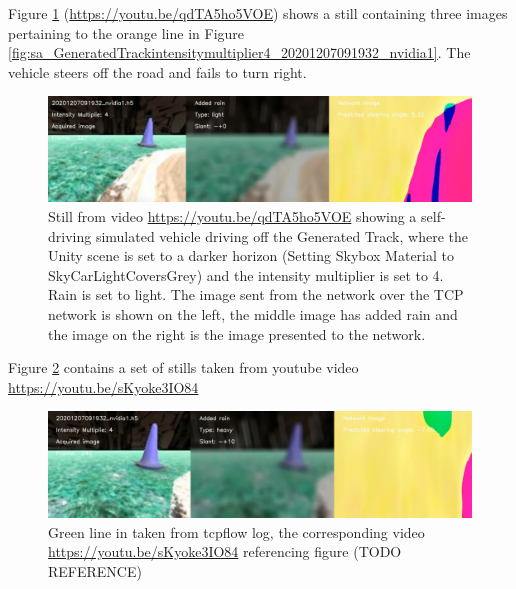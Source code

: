 Figure \ref{fig:youtube20201207091932nvidia1lightrainmult_4_h5} (\url{https://youtu.be/qdTA5ho5VOE}) shows a still containing three images pertaining to the orange line in Figure \ref{fig:sa_GeneratedTrackintensitymultiplier4_20201207091932_nvidia1}. The vehicle steers off the road and fails to turn right.

\begin{figure}[ht]
 \centering 
 \includegraphics[width=\textwidth]{Figures/youtube20201207091932nvidia1lightrainmult_4_h5.png}
 \caption{Still from video \url{https://youtu.be/qdTA5ho5VOE} showing a self-driving simulated vehicle driving off the Generated Track, where the Unity scene is set to a darker horizon (Setting Skybox Material to SkyCarLightCoversGrey) and the intensity multiplier is set to 4. Rain is set to light. The image sent from the network over the TCP network is shown on the left, the middle image has added rain and the image on the right is the image presented to the network.}
 \label{fig:youtube20201207091932nvidia1lightrainmult_4_h5} 
\end{figure}

Figure \ref{fig:youtube20201207091932nvidia1heavy10mult_4_h5} contains a set of stills taken from youtube video \url{https://youtu.be/sKyoke3IO84}
\begin{figure}[ht]
 \centering 
 \includegraphics[width=\textwidth]{Figures/youtube20201207091932nvidia1heavy10mult_4_h5.png}
 \caption{Green line in taken from tcpflow log, the corresponding video \url{https://youtu.be/sKyoke3IO84} referencing figure (TODO REFERENCE)}
 \label{fig:youtube20201207091932nvidia1heavy10mult_4_h5} 
\end{figure}




